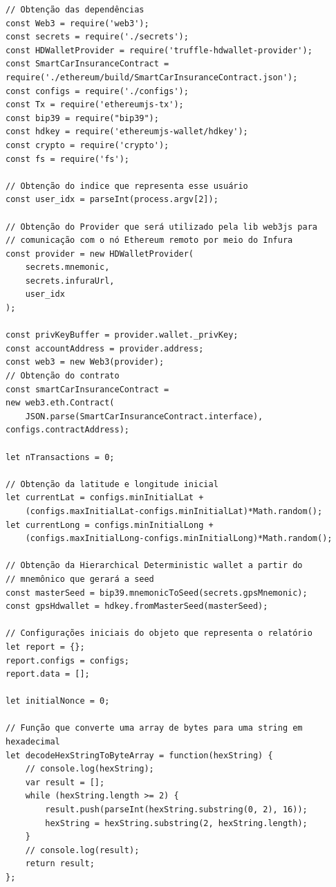 \clearpage
\begin{code}
\begin{verbatim}
// Obtenção das dependências
const Web3 = require('web3');
const secrets = require('./secrets');
const HDWalletProvider = require('truffle-hdwallet-provider');
const SmartCarInsuranceContract = 
require('./ethereum/build/SmartCarInsuranceContract.json');
const configs = require('./configs');
const Tx = require('ethereumjs-tx');
const bip39 = require("bip39");
const hdkey = require('ethereumjs-wallet/hdkey');
const crypto = require('crypto');
const fs = require('fs');

// Obtenção do indice que representa esse usuário
const user_idx = parseInt(process.argv[2]);

// Obtenção do Provider que será utilizado pela lib web3js para 
// comunicação com o nó Ethereum remoto por meio do Infura
const provider = new HDWalletProvider(
    secrets.mnemonic,
    secrets.infuraUrl,
    user_idx
);

const privKeyBuffer = provider.wallet._privKey;
const accountAddress = provider.address;
const web3 = new Web3(provider);
// Obtenção do contrato
const smartCarInsuranceContract = 
new web3.eth.Contract(
    JSON.parse(SmartCarInsuranceContract.interface), configs.contractAddress);

let nTransactions = 0;

// Obtenção da latitude e longitude inicial
let currentLat = configs.minInitialLat + 
    (configs.maxInitialLat-configs.minInitialLat)*Math.random();
let currentLong = configs.minInitialLong + 
    (configs.maxInitialLong-configs.minInitialLong)*Math.random();

// Obtenção da Hierarchical Deterministic wallet a partir do 
// mnemônico que gerará a seed
const masterSeed = bip39.mnemonicToSeed(secrets.gpsMnemonic);
const gpsHdwallet = hdkey.fromMasterSeed(masterSeed);

// Configurações iniciais do objeto que representa o relatório
let report = {};
report.configs = configs;
report.data = [];

let initialNonce = 0;

// Função que converte uma array de bytes para uma string em hexadecimal 
let decodeHexStringToByteArray = function(hexString) {
    // console.log(hexString);
    var result = [];
    while (hexString.length >= 2) { 
        result.push(parseInt(hexString.substring(0, 2), 16));
        hexString = hexString.substring(2, hexString.length);
    }
    // console.log(result);
    return result;
};


\end{verbatim}
\end{code}
